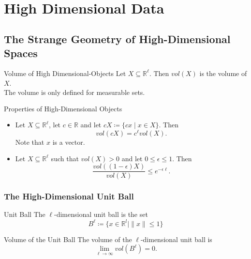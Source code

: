 \documentclass[english]{panikzettel}
\begin{document}
\section{High Dimensional Data}
\subsection{The Strange Geometry of High-Dimensional Spaces}

\begin{halfboxl}
\vspace{-\baselineskip}
	\begin{defi}{Volume of High Dimensional-Objects}
	Let $X\subseteq \mathbb{R}^\ell$. Then $vol(X)$ is the volume of $X$.\\
	The volume is only defined for measurable sets.
	\end{defi}
\end{halfboxl}
\begin{halfboxr}
\vspace{-\baselineskip}
	\begin{theo}{Properties of High-Dimensional Objects}
	\begin{itemize}[leftmargin=*]
	\item Let $X\subseteq \mathbb{R}^\ell$, let $c\in\mathbb{R}$ and let $cX\coloneqq \{cx\mid x\in X \}$. Then
	\vspace{-0.5\baselineskip}
	\[
	vol(cX)=c^\ell vol(X).
	\]
	Note that $x$ is a vector.
	\item Let $X\subseteq \mathbb{R}^\ell$ such that $vol(X)>0$ and let $0\leq \epsilon\leq 1$. Then
	\vspace{-0.5\baselineskip}
	\[
	\frac{vol((1-\epsilon)X)}{vol(X)}\leq e^{-\epsilon\ell}.
	\]
	\end{itemize}
	\end{theo}
\end{halfboxr}

\subsubsection{The High-Dimensional Unit Ball}
\begin{halfboxl}
\vspace{-\baselineskip}
	\begin{defi}{Unit Ball}
	The $\ell$-dimensional unit ball is the set
	\[
	B^\ell \coloneqq \{x\in\mathbb{R}^l \mid \parallel x \parallel \leq 1 \}
	\]
	\end{defi}
\end{halfboxl}
\begin{halfboxr}
	\vspace{-\baselineskip}
	\begin{theo}{Volume of the Unit Ball}
	The volume of the $\ell$-dimensional unit ball is
	\[
	\lim_{\ell \to \infty} vol(B^\ell) = 0.
	\]
	\end{theo}
\end{halfboxr}
\end{document}
